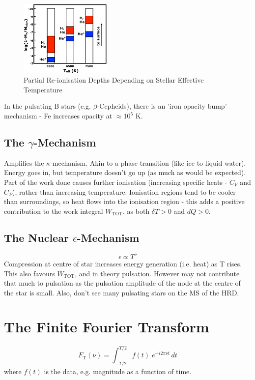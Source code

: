 \documentclass{spy}
\begin{document}
\begin{figure}[h]
    \centering
    \includegraphics[width=0.4\textwidth]{ionisation_temp.eps}
    \caption{Partial Re-ionisation Depths Depending on Stellar Effective Temperature} 
    \label{ionisation_temp_diagram}
\end{figure}

In the pulsating B stars (e.g. \(\beta\)-Cepheids), there is an 'iron opacity bump' mechanism - Fe increases opacity at \(\approx 10^5\) K. 

\subsection{The \(\gamma\)-Mechanism}
Amplifies the \(\kappa\)-mechanism. Akin to a phase transition (like ice to liquid water). Energy goes in, but temperature doesn't go up (as much as would be expected). Part of the work done causes further ionisation (increasing specific heats - \(C_V\) and \(C_P\)), rather than increasing temperature. Ionisation regions tend to be cooler than surroundings, so heat flows into the ionisation region - this adds a positive contribution to the work integral \(W_\mathrm{TOT}\), as both \(\delta T > 0\) and \(dQ > 0\).

\subsection{The Nuclear \(\epsilon\)-Mechanism}
\begin{equation}
\epsilon \propto T^\nu
\end{equation}
Compression at centre of star increases energy generation (i.e. heat) as T rises. This also favours \(W_\mathrm{TOT}\), and in theory pulsation. However may not contribute that much to pulsation as the pulsation amplitude of the node at the centre of the star is small. Also, don't see many pulsating stars on the MS of the HRD.



\section{The Finite Fourier Transform}
\begin{equation}
F_\mathrm{T}(\nu) = \int_{-T/2}^{T/2} f(t) \;  e^{-i 2\pi \nu t} \,dt
\end{equation}
where \(f(t)\) is the data, e.g. magnitude as a function of time. 
\end{document}
